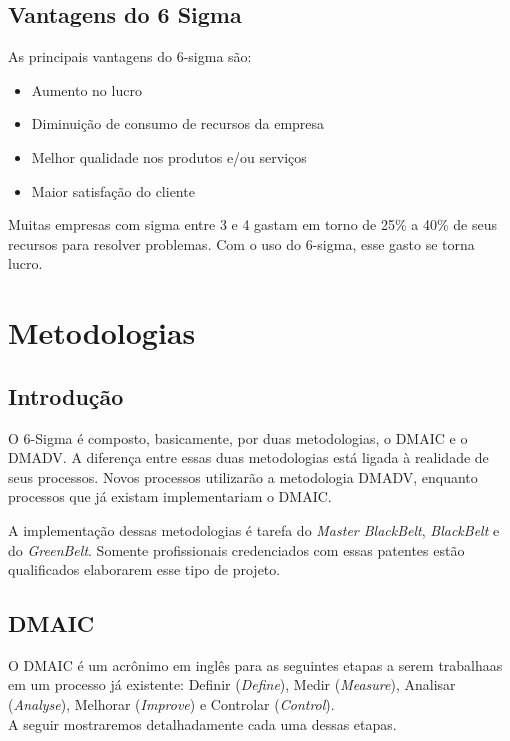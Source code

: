 \documentclass{abnt}
\begin{document}
		\section {Vantagens do 6 Sigma}
		
		As principais vantagens do 6-sigma são: 
		\begin{itemize}
			\item {Aumento no lucro}
			\item {Diminuição de consumo de recursos da empresa}
			\item {Melhor qualidade nos produtos e/ou serviços}
			\item {Maior satisfação do cliente}
		\end{itemize}
		
		Muitas empresas com sigma entre 3 e 4 gastam em torno de 25\% a 40\% de seus recursos para resolver problemas. Com o uso do 6-sigma, esse gasto se torna lucro.
		  
				
	\chapter {Metodologias}
		\section {Introdução}
		
			 O 6-Sigma é composto, basicamente, por duas metodologias, o DMAIC e o DMADV. A diferença entre 
			 essas duas metodologias está ligada à realidade de seus processos. Novos processos utilizarão 
			 a metodologia DMADV, enquanto processos que já existam implementariam o DMAIC.
			 
			 A implementação dessas metodologias é tarefa do \textit{Master BlackBelt}, \textit{BlackBelt} e do \textit{GreenBelt}. Somente profissionais 
			 credenciados com essas patentes estão qualificados elaborarem esse tipo de projeto.
			 
			\section {DMAIC}
				O DMAIC é um acrônimo em inglês para as seguintes etapas a serem trabalhaas em 
				um processo já existente: Definir (\textit{Define}), Medir (\textit{Measure}), 
				Analisar (\textit{Analyse}), Melhorar (\textit{Improve}) e Controlar (\textit{Control}).
				\\
				A seguir mostraremos detalhadamente cada uma dessas etapas.
				
\end{document}

